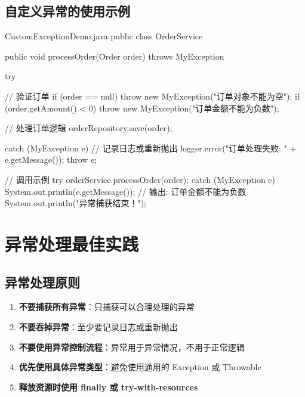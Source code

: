 \subsection{自定义异常的使用示例}

\begin{codeblock}[Java]{CustomExceptionDemo.java}
public class OrderService {
    
    public void processOrder(Order order) throws MyException {
        try {
            // 验证订单
            if (order == null) {
                throw new MyException("订单对象不能为空");
            }
            if (order.getAmount() < 0) {
                throw new MyException("订单金额不能为负数");
            }
            
            // 处理订单逻辑
            orderRepository.save(order);
            
        } catch (MyException e) {
            // 记录日志或重新抛出
            logger.error("订单处理失败: " + e.getMessage());
            throw e;
        }
    }
}

// 调用示例
try {
    orderService.processOrder(order);
} catch (MyException e) {
    System.out.println(e.getMessage());  // 输出: 订单金额不能为负数
    System.out.println("异常捕获结束！");
}
\end{codeblock}


\section{异常处理最佳实践}

\subsection{异常处理原则}

\begin{enumerate}
  \itemsep=0pt
  \item \textbf{不要捕获所有异常}：只捕获可以合理处理的异常
  \item \textbf{不要吞掉异常}：至少要记录日志或重新抛出
  \item \textbf{不要使用异常控制流程}：异常用于异常情况，不用于正常逻辑
  \item \textbf{优先使用具体异常类型}：避免使用通用的 Exception 或 Throwable
  \item \textbf{释放资源时使用 finally 或 try-with-resources}
\end{enumerate}

